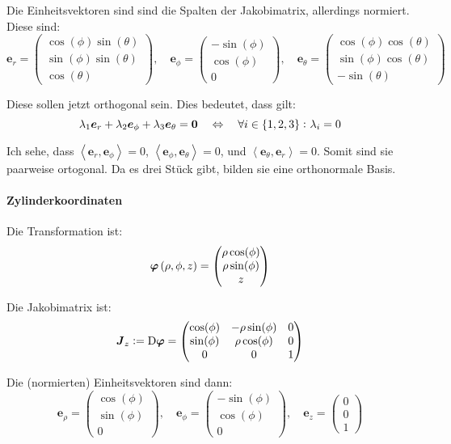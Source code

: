 \documentclass[11pt, ngerman, fleqn]{article}
\newcommand{\inner}[2]{\left\langle #1, #2 \right\rangle}
\newcommand{\tens}[1]{\boldsymbol{#1}}
\renewcommand{\vec}[1]{\boldsymbol{#1}}
\begin{document}
Die Einheitsvektoren sind sind die Spalten der Jakobimatrix, allerdings normiert. Diese sind:
\[
	\vec e_r = \begin{pmatrix}
		\cos(\phi) \sin(\theta) \\
		\sin(\phi) \sin(\theta) \\
		\cos(\theta)
	\end{pmatrix}
	, \quad
	\vec e_\phi = \begin{pmatrix}
		-\sin(\phi) \\
		\cos(\phi) \\
		0
	\end{pmatrix}
	, \quad
	\vec e_\theta = \begin{pmatrix}
		\cos(\phi) \cos(\theta) \\
		\sin(\phi) \cos(\theta) \\
		-\sin(\theta)
	\end{pmatrix}
\]

Diese sollen jetzt orthogonal sein. Dies bedeutet, dass gilt:
\[
	\lambda_1 \vec e_r + \lambda_2 \vec e_\phi + \lambda_3 \vec e_\theta = \vec 0
	\quad \Leftrightarrow \quad
	\forall i \in \set{1, 2, 3}\colon \lambda_i = 0
\]

Ich sehe, dass $\inner{\vec e_r}{\vec e_\phi} = 0$, $\inner{\vec e_\phi}{\vec e_\theta} = 0$, und $\inner{\vec e_\theta}{\vec e_r} = 0$. Somit sind sie paarweise ortogonal. Da es drei Stück gibt, bilden sie eine orthonormale Basis.

\paragraph{Zylinderkoordinaten}

Die Transformation ist:
\[
	\vec\varphi\del{\rho, \phi, z} = \begin{pmatrix}
		\rho \cos(\phi) \\
		\rho \sin(\phi) \\
		z
	\end{pmatrix}
\]

Die Jakobimatrix ist:
\[
	\tens J_z := \Dif \vec\varphi = \begin{pmatrix}
		\cos(\phi) & - \rho \sin(\phi) & 0 \\
		\sin(\phi) & \rho \cos(\phi) & 0 \\
						  0 & 0 & 1
	\end{pmatrix}
\]

Die (normierten) Einheitsvektoren sind dann:
\[
	\vec e_\rho = \begin{pmatrix}
		\cos(\phi) \\
		\sin(\phi) \\
		0
	\end{pmatrix}
	, \quad
	\vec e_\phi = \begin{pmatrix}
		-\sin(\phi) \\
		\cos(\phi) \\
		0
	\end{pmatrix}
	, \quad
	\vec e_z = \begin{pmatrix}
		0 \\
		0 \\
		1
	\end{pmatrix}
\]
\end{document}
